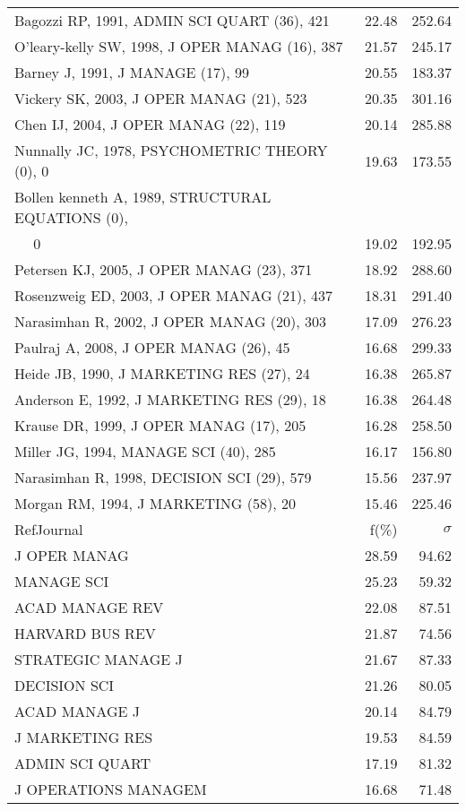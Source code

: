 \documentclass[a4paper,11pt]{report}
\begin{document}
\begin{landscape}
\begin{table}[!ht]
{\begin{tabular}{|l r r|}
Bagozzi RP, 1991, ADMIN SCI QUART (36), 421 & 22.48 & 252.64\\
O'leary-kelly SW, 1998, J OPER MANAG (16), 387 & 21.57 & 245.17\\
Barney J, 1991, J MANAGE (17), 99 & 20.55 & 183.37\\
Vickery SK, 2003, J OPER MANAG (21), 523 & 20.35 & 301.16\\
Chen IJ, 2004, J OPER MANAG (22), 119 & 20.14 & 285.88\\
Nunnally JC, 1978, PSYCHOMETRIC THEORY (0), 0 & 19.63 & 173.55\\
Bollen kenneth A, 1989, STRUCTURAL EQUATIONS (0), &  & \\
$\quad$ 0 & 19.02 & 192.95\\
Petersen KJ, 2005, J OPER MANAG (23), 371 & 18.92 & 288.60\\
Rosenzweig ED, 2003, J OPER MANAG (21), 437 & 18.31 & 291.40\\
Narasimhan R, 2002, J OPER MANAG (20), 303 & 17.09 & 276.23\\
Paulraj A, 2008, J OPER MANAG (26), 45 & 16.68 & 299.33\\
Heide JB, 1990, J MARKETING RES (27), 24 & 16.38 & 265.87\\
Anderson E, 1992, J MARKETING RES (29), 18 & 16.38 & 264.48\\
Krause DR, 1999, J OPER MANAG (17), 205 & 16.28 & 258.50\\
Miller JG, 1994, MANAGE SCI (40), 285 & 16.17 & 156.80\\
Narasimhan R, 1998, DECISION SCI (29), 579 & 15.56 & 237.97\\
Morgan RM, 1994, J MARKETING (58), 20 & 15.46 & 225.46\\
\hline
\hline
RefJournal & f(\%) & $\sigma$\\
\hline
J OPER MANAG & 28.59 & 94.62\\
MANAGE SCI & 25.23 & 59.32\\
ACAD MANAGE REV & 22.08 & 87.51\\
HARVARD BUS REV & 21.87 & 74.56\\
STRATEGIC MANAGE J & 21.67 & 87.33\\
DECISION SCI & 21.26 & 80.05\\
ACAD MANAGE J & 20.14 & 84.79\\
J MARKETING RES & 19.53 & 84.59\\
ADMIN SCI QUART & 17.19 & 81.32\\
J OPERATIONS MANAGEM & 16.68 & 71.48\\
\hline
\end{tabular}
}
\end{table}


\end{landscape}
\end{document}

